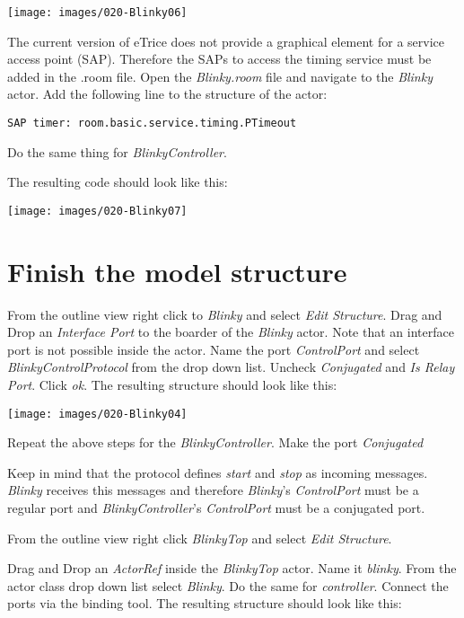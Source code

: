 \texttt{[image: images/020-Blinky06]}

The current version of eTrice does not provide a graphical element for a service access point (SAP). Therefore the SAPs to access the timing service must be added in the .room file. Open the \textit{Blinky.room} file and navigate to the \textit{Blinky} actor. Add the following line to the structure of the actor:

\begin{verbatim}SAP timer: room.basic.service.timing.PTimeout \end{verbatim}

Do the same thing for \textit{BlinkyController}.

The resulting code should look like this:

\texttt{[image: images/020-Blinky07]}


\section{Finish the model structure}

From the outline view right click to \textit{Blinky} and select \textit{Edit Structure}. Drag and Drop an \textit{Interface Port} to the boarder of the \textit{Blinky} actor. Note that an interface port is not possible inside the actor. Name the port \textit{ControlPort} and select \textit{BlinkyControlProtocol} from the drop down list. Uncheck \textit{Conjugated} and \textit{Is Relay Port}. Click \textit{ok}. The resulting structure should look like this:

\texttt{[image: images/020-Blinky04]}

Repeat the above steps for the \textit{BlinkyController}. Make the port \textit{Conjugated}

Keep in mind that the protocol defines \textit{start} and \textit{stop} as incoming messages. \textit{Blinky} receives this messages and therefore \textit{Blinky}'s \textit{ControlPort} must be a regular port and \textit{BlinkyController}'s \textit{ControlPort} must be a conjugated port.


From the outline view right click \textit{BlinkyTop} and select \textit{Edit Structure}.

Drag and Drop an \textit{ActorRef} inside the \textit{BlinkyTop} actor. Name it \textit{blinky}. From the actor class drop down list select \textit{Blinky}. Do the same for \textit{controller}. Connect the ports via the binding tool. The resulting structure should look like this:

